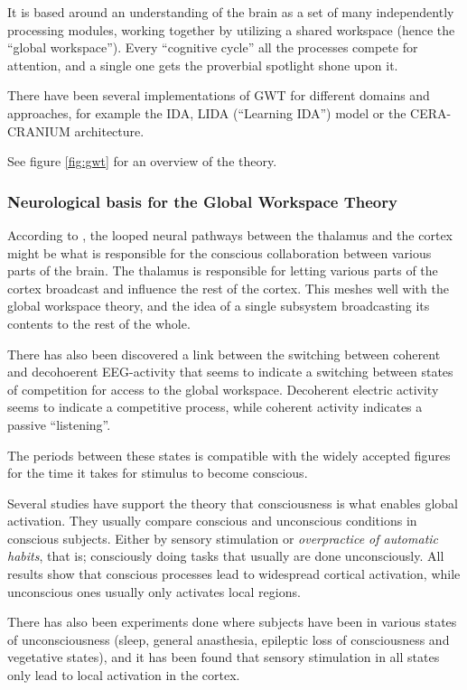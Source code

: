 It is based around an understanding of the brain as a set of many independently processing modules, working together by utilizing a shared workspace (hence the ``global workspace''). Every ``cognitive cycle'' all the processes compete for attention, and a single one gets the proverbial spotlight shone upon it.\cite{baars2005gwt}

There have been several implementations of GWT for different domains and approaches, for example the IDA, LIDA (``Learning IDA'') model\cite{franklin2007lida} or the CERA-CRANIUM architecture\cite{arrabales2009ceracranium}.

See figure \ref{fig:gwt} for an overview of the theory.

\subsubsection{Neurological basis for the Global Workspace Theory}
According to \cite{llinas1998neuronal}, the looped neural pathways between the thalamus and the cortex might be what is responsible for the conscious collaboration between various parts of the brain. The thalamus is responsible for letting various parts of the cortex broadcast and influence the rest of the cortex. This meshes well with the global workspace theory, and the idea of a single subsystem broadcasting its contents to the rest of the whole.

There has also been discovered a link between the switching between coherent and decohoerent EEG-activity that seems to indicate a switching between states of competition for access to the global workspace. Decoherent electric activity seems to indicate a competitive process, while coherent activity indicates a passive ``listening''.\cite{freeman2003neurobiological}

The periods between these states is compatible with the widely accepted figures for the time it takes for stimulus to become conscious.\cite{shanahan2005applying}

Several studies have support the theory that consciousness is what enables global activation. They usually compare conscious and unconscious conditions in conscious subjects. Either by sensory stimulation or {\em overpractice of automatic habits}, that is; consciously doing tasks that usually are done unconsciously. All results show that conscious processes lead to widespread cortical activation, while unconscious ones usually only activates local regions.\cite{baars2003brain}

There has also been experiments done where subjects have been in various states of unconsciousness (sleep, general anasthesia, epileptic loss of consciousness and vegetative states), and it has been found that sensory stimulation in all states only lead to local activation in the cortex.\cite{shanahan2005applying}

